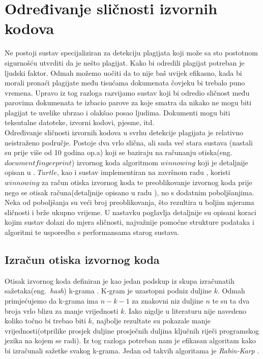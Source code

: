 \chapter{Određivanje sličnosti izvornih kodova}

Ne postoji sustav specijaliziran za detekciju plagijata koji može sa sto postotnom sigurnošću utvrditi da je nešto plagijat. Kako bi odredili plagijat potreban je ljudski faktor.  Odmah možemo uočiti da to nije baš uvijek efikasno, kada bi morali pronaći plagijate među tisućama dokumenata čovjeku bi trebalo puno vremena. Upravo iz tog razloga razvijamo sustav koji bi odredio sličnost među parovima dokumenata te izbacio parove za koje smatra da nikako ne mogu biti plagijat te uvelike ubrzao i olakšao posao ljudima. Dokumenti mogu biti teksutalne datoteke, izvorni kodovi, pjesme, itd. \\
	
	Određivanje sličnosti izvornih kodova u svrhu detekcije plagijata je relativno neistraženo područje. Postoje dva vrlo slična, ali sada već stara sustava (nastali su prije više od 10 godina op.a)  \cite{moss} \cite{jplag} koji se baziraju na računanju otiska(eng.~$document fingerprint$) izvornog koda algoritmom $winnowing$ koji je detaljnije opisan u \cite{winnowing}. $Turtle$, kao i sustav implementiran na završnom radu \cite{plagijator}, koristi $winnowing$ za račun otiska izvornog koda te preoblikovanje izvornog koda prije nego se otisak računa(detaljnije opisano u radu \cite{dorian}), no s dodatnim poboljšanjima. Neka od poboljšanja su veći broj preoblikovanja, što rezultira u boljim mjerama sličnosti i brže ukupno vrijeme. U nastavku poglavlja detaljnije su opisani koraci kojim sustav dolazi do mjera sličnosti, najvažnije pomoćne strukture podataka i algoritmi te usporedba s performansama starog sustava.

\newpage
{}

\section{Izračun otiska izvornog koda}

Otisak izvornog koda definiran je kao jedan podskup iz skupa izračunatih sažetaka(eng.~\textit{hash}) k-grama \cite{winnowing}. K-gram je uzastopni podniz duljine $k$. Odmah primjećujemo da k-grama ima $n-k-1$ za znakovni niz duljine $n$ te su ta dva broja vrlo blizu za manje vrijednosti $k$. Iako nigdje u literaturu nije navedeno koliko točno bi trebao biti $k$, najbolje rezultate su pokazale manje vrijednosti(otprilike prosjek duljine prosječnih duljina ključnih riječi programskog jezika na kojem se radi).  Iz tog razloga potreban nam je efikasan algoritam kako bi izračunali sažetke svakog k-grama. Jedan od takvih algoritama je \textit{Rabin-Karp} \cite{rabin-karp}.

